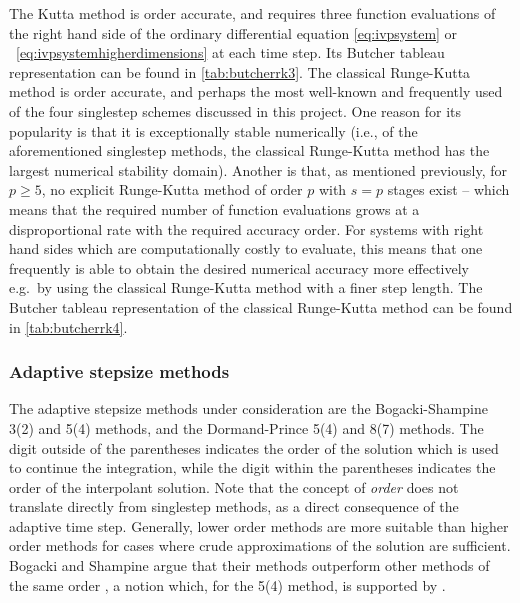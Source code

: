 The Kutta method is  order accurate, and requires three function
evaluations of the right hand side of the ordinary differential equation
\eqref{eq:ivpsystem} or ~\eqref{eq:ivpsystemhigherdimensions} at each time
step. Its Butcher tableau representation can be found in \cref{tab:butcherrk3}.
The classical Runge-Kutta method is  order accurate, and perhaps the most
well-known and frequently used of the four singlestep schemes discussed in this
project. One reason for its popularity is that it is exceptionally stable
numerically (i.e., of the aforementioned singlestep methods, the classical
Runge-Kutta method has the largest numerical stability domain). Another is that,
as mentioned previously, for $p\geq5$, no explicit Runge-Kutta method of order
$p$ with $s=p$ stages exist
\parencite[p.173]{hairer1993solving} -- which means that
the required number of function evaluations grows at a disproportional rate with
the required accuracy order. For systems with right hand sides which are
computationally costly to evaluate, this means that one frequently is able to
obtain the desired numerical accuracy more effectively e.g.\ by using the
classical Runge-Kutta method with a finer step length. The Butcher tableau
representation of the classical Runge-Kutta method can be found in
\cref{tab:butcherrk4}.





\subsubsection{Adaptive stepsize methods}
\label{ssub:adaptive_stepsize_methods}

The adaptive stepsize methods under consideration are the Bogacki-Shampine
3(2) and 5(4) methods, and the Dormand-Prince 5(4) and 8(7) methods. The digit
outside of the parentheses indicates the order of the solution which is used
to continue the integration, while the digit within the parentheses indicates
the order of the interpolant solution. Note that the concept of \emph{order}
does not translate directly from singlestep methods, as a direct consequence
of the adaptive time step. Generally, lower order methods are more
suitable than higher order methods for cases where crude approximations of the
solution are sufficient. Bogacki and Shampine argue that their methods
outperform other methods of the same order
\parencite{bogacki1989pair,bogacki1996efficient}, a notion which, for the 5(4)
method, is supported by
\textcite[p.194]{hairer1993solving}.

